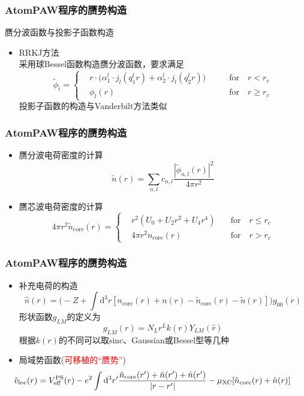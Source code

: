 {{\frame
{
	\frametitle{\textrm{AtomPAW}程序的赝势构造}
	赝分波函数与投影子函数构造
	\begin{itemize}
		\item \textrm{RRKJ}方法\\
			采用球\textrm{Bessel}函数构造赝分波函数，要求满足
	\begin{displaymath}
		\tilde\phi_i=\left\{
			\begin{aligned}
				&r\cdot\bigg(\alpha_1^l\cdot j_l(q_1^lr)+\alpha_2^l\cdot j_l(q_2^lr)\bigg) \qquad &\mathrm{for}\quad r<r_c \\
				&\phi_l(r)\qquad &\mathrm{for}\quad r\geqslant r_c
			\end{aligned}
			\right.
	\end{displaymath}
	投影子函数的构造与\textrm{Vanderbilt}方法类似
	\end{itemize}
}


\frame
{
	\frametitle{\textrm{AtomPAW}程序的赝势构造}
	\begin{itemize}
		\item 赝分波电荷密度的计算
	$$\tilde n(r)=\sum_{n,l}c_{n,l}\dfrac{|\tilde\phi_{n,l}(r)|^2}{4\pi r^2}$$
		\item 赝芯波电荷密度的计算
	\begin{displaymath}
		4\pi r^2\tilde n_{\mathrm{core}}(r)=\left\{
			\begin{aligned}
				&r^2(U_0+U_2r^2+U_4r^4)\quad &\mathrm{for}\quad r\leqslant r_c \\
				&4\pi r^2n_{\mathrm{core}}(r)\quad &\mathrm{for}\quad r>r_c
			\end{aligned}
			\right.
	\end{displaymath}
	\end{itemize}
}

\frame
{
	\frametitle{\textrm{AtomPAW}程序的赝势构造}
	\begin{itemize}
		\item 补充电荷的构造
			$$\hat n(r)=\bigg(-Z+\int\mathrm{d}^3r[n_{\mathrm{core}}(r)+n(r)-\tilde n_{\mathrm{core}}(r)-\tilde n(r)]\bigg)g_{00}(r)$$
			形状函数$g_{LM}$的定义为$$g_{LM}(r)=N_Lr^Lk(r)Y_{LM}(\hat r)$$
			根据$k(r)$的不同可以取\textrm{sinc}、\textrm{Gaussian}或\textrm{Bessel}型等几种
		\item 局域势函数(\textcolor{red}{可移植的“赝势”})
			{\fontsize{9.5pt}{5.2pt}\selectfont$$\hspace*{-25pt}\tilde v_{\mathrm{loc}}(r)=V_{\mathrm{eff}}^{\mathrm{PS}}(r)-e^2\int\mathrm{d}^3r^{\prime}\dfrac{\tilde n_{\mathrm{core}}(r^{\prime})+\tilde n(r^{\prime})+\hat n(r^{\prime})}{|r-r^{\prime}|}-\mu_{\mathrm{XC}}[\tilde n_{\mathrm{core}}(r)+\tilde n(r)]$$}
	\end{itemize}
}

}}
